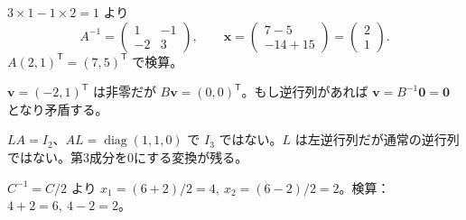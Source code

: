 \documentclass[11pt]{article}
\begin{document}

\problem[逆行列と復元]
\begin{ans}
$3\times1-1\times2=1$ より \[A^{-1}=\begin{pmatrix}1&-1\\-2&3\end{pmatrix},\qquad \boldsymbol x=\begin{pmatrix}7-5\\-14+15\end{pmatrix}=\begin{pmatrix}2\\1\end{pmatrix}.\] $A(2,1)^{\mathsf T}=(7,5)^{\mathsf T}$ で検算。
\end{ans}

\problem[正則でない変換]
\begin{ans}
$\boldsymbol v=(-2,1)^{\mathsf T}$ は非零だが $B\boldsymbol v=(0,0)^{\mathsf T}$。もし逆行列があれば $\boldsymbol v=B^{-1}\boldsymbol0=\boldsymbol0$ となり矛盾する。
\end{ans}
\newpage

\problem[片側逆]
\begin{ans}
$LA=I_2$、$AL=\operatorname{diag}(1,1,0)$ で $I_3$ ではない。$L$ は左逆行列だが通常の逆行列ではない。第3成分を0にする変換が残る。
\end{ans}

\problem[センサ校正]
\begin{ans}
$C^{-1}=C/2$ より $x_1=(6+2)/2=4,\ x_2=(6-2)/2=2$。検算：$4+2=6,\ 4-2=2$。
\end{ans}
\end{document}
